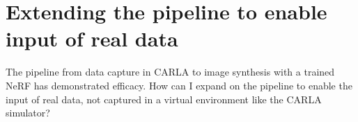 














































\section{Extending the pipeline to enable input of real data}

\begin{comment}
Premise: Have a working pipeline to collect, train and render novel views from CARLA
Question: How can this pipeline be extended to enable input of real data?

\begin{itemize}
    \item How to collect images and camera poses from the car?
    \item Which changes had to be done to the pipeline to support this change?
\end{itemize}
\end{comment}

The pipeline from data capture in CARLA to image synthesis with a trained NeRF has demonstrated efficacy. How can I expand on the pipeline to enable the input of real data, not captured in a virtual environment like the CARLA simulator?


